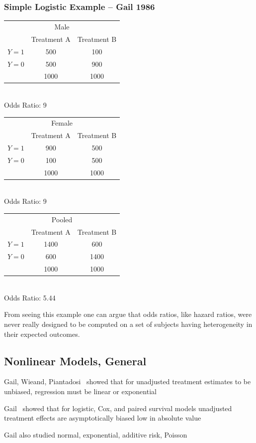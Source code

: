 \subsubsection{Simple Logistic Example -- Gail 1986}
\newcommand{\subtab}[6]{\begin{center}\begin{tabular}{l|c|c|}
    \multicolumn{3}{c}{#1} \\
    & Treatment A   & Treatment B \\ \hline
    $Y=1$ & #2 & #3 \\ \hline
    $Y=0$ & #4 & #5 \\ \hline
          & 1000 & 1000 \\
    \end{tabular}
    \\ Odds Ratio: #6
    \end{center}}
\subtab{Male}{500}{100}{500}{900}{9}
\subtab{Female}{900}{500}{100}{500}{9}
\subtab{Pooled}{1400}{600}{600}{1400}{5.44}

From seeing this example one can argue that odds ratios, like hazard
ratios, were never really designed to be computed on a set of subjects
having heterogeneity in their expected outcomes.

\subsection{Nonlinear Models, General}
\bi
\item   Gail, Wieand, Piantadosi~\cite{gai84bia} showed that for unadjusted
        treatment estimates to be unbiased, regression must be linear
        or exponential
\item   Gail~\cite{gai86adj} showed that for logistic, Cox, and paired survival
        models unadjusted treatment effects are asymptotically biased
        low in absolute value
\item   Gail also studied normal, exponential, additive risk, Poisson
\ei
{}


